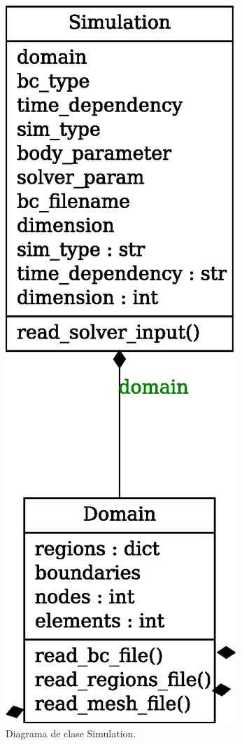 \documentclass[xcolor=table,serif]{beamer}
\begin{document}
{{\begin{figure}
			\includegraphics[scale=0.35]{classes_reduced_2.eps}
			\caption{Diagrama de clase Simulation.}
			\end{figure}		
		}
		}
\end{document}
